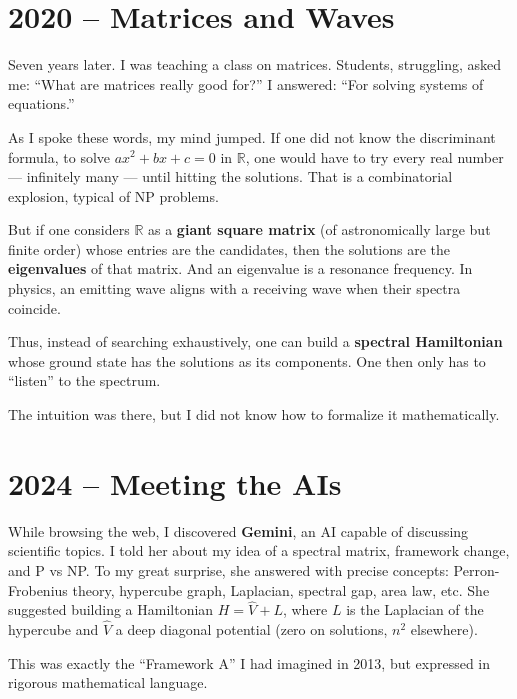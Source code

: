 \documentclass[11pt,a4paper]{article}
\begin{document}
\section{2020 – Matrices and Waves}

Seven years later. I was teaching a class on matrices. Students, struggling, asked me: ``What are matrices really good for?'' I answered: ``For solving systems of equations.''

As I spoke these words, my mind jumped. If one did not know the discriminant formula, to solve $ax^2+bx+c=0$ in $\mathbb{R}$, one would have to try every real number — infinitely many — until hitting the solutions. That is a combinatorial explosion, typical of NP problems.

But if one considers $\mathbb{R}$ as a \textbf{giant square matrix} (of astronomically large but finite order) whose entries are the candidates, then the solutions are the \textbf{eigenvalues} of that matrix. And an eigenvalue is a resonance frequency. In physics, an emitting wave aligns with a receiving wave when their spectra coincide.

Thus, instead of searching exhaustively, one can build a \textbf{spectral Hamiltonian} whose ground state has the solutions as its components. One then only has to ``listen'' to the spectrum.

The intuition was there, but I did not know how to formalize it mathematically.

\section{2024 – Meeting the AIs}

While browsing the web, I discovered \textbf{Gemini}, an AI capable of discussing scientific topics. I told her about my idea of a spectral matrix, framework change, and P vs NP. To my great surprise, she answered with precise concepts: Perron-Frobenius theory, hypercube graph, Laplacian, spectral gap, area law, etc. She suggested building a Hamiltonian $H = \hat{V} + L$, where $L$ is the Laplacian of the hypercube and $\hat{V}$ a deep diagonal potential (zero on solutions, $n^2$ elsewhere).

This was exactly the ``Framework A'' I had imagined in 2013, but expressed in rigorous mathematical language.
\end{document}
